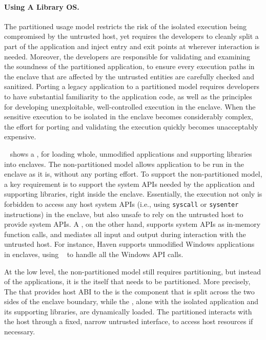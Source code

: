 \paragraph{Using A Library OS.}
 
The partitioned usage model
restricts the risk of the isolated execution being
compromised by the untrusted host,
yet requires the developers to
cleanly split a part of the application
and inject entry and exit points at wherever interaction is needed.
Moreover, the developers are responsible
for validating and examining the soundness of the partitioned application,
to ensure every execution paths in the enclave
that are affected by the untrusted entities
are carefully checked and sanitized.
Porting a legacy application to a partitioned model
requires developers to have substantial familiarity to the application code,
as well as the principles for
developing unexploitable,
well-controlled execution in the enclave.
When the sensitive execution to be isolated in the enclave
becomes considerably complex,
the effort for porting and validating the execution
quickly becomes unacceptably expensive.

~\citep{baumann14haven}
shows a ,
for loading whole, unmodified applications and supporting libraries
into enclaves.
The non-partitioned model allows application to be run in the enclave as it is, without any porting effort.
To support the non-partitioned model,
a key requirement is to support the system APIs needed by
the application and supporting libraries,
right inside the enclave.
Essentially, the execution not only is forbidden to access any host system APIs
(i.e., using {\tt syscall} or {\tt sysenter} instructions)
in the enclave,
but also unsafe to rely on the untrusted host
to provide system APIs.
A \libos{}, on the other hand, supports system APIs as in-memory function calls,
and mediates all input and output
during interaction with the untrusted host.
For instance, Haven supports unmodified Windows applications in enclaves,
using \drawbridge{} \libos{}~\citep{porter11drawbridge}
to handle all the Windows API calls.

At the low level, the non-partitioned model still requires partitioning, but instead of the applications,
it is the \libos{} itself that needs to be partitioned.
More precisely, The \pal{} that provides host ABI to the \libos{} is the component that is split across the two sides of the enclave boundary,
while the \libos{}, alone with the isolated application
and its supporting libraries,
are dynamically loaded.
The partitioned \pal{} interacts with the host through a fixed, narrow untrusted interface,
to access host resources if necessary.
